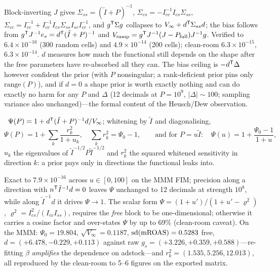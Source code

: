 Block-inverting $J$ gives $\Sigma_{ss} = (\tilde I + P)^{-1}$, $\Sigma_{cs} = -I_{cc}^{-1}I_{cs}\Sigma_{ss}$, $\Sigma_{cc} = I_{cc}^{-1} + I_{cc}^{-1}I_{cs}\Sigma_{ss}I_{sc}I_{cc}^{-1}$, and $g^{\mathsf{T}}\Sigma g$ collapses to $V_\infty + d^{\mathsf{T}}\Sigma_{ss}d$; the bias follows from $g^{\mathsf{T}} J^{-1}e_s = d^{\mathsf{T}}(\tilde I + P)^{-1}$ and $V_{\rm samp} = g^{\mathsf{T}} J^{-1}(J - P_{\rm full})J^{-1}g$. Verified to $6.4\times10^{-16}$ (300 random cells) and $4.9\times10^{-14}$ (200 cells); clean-room $6.3\times10^{-15}$, $6.3\times10^{-14}$. $d$ measures how much the functional still depends on the shape after the free parameters have re-absorbed all they can. The bias ceiling is $-d^{\mathsf{T}}\Delta$ however confident the prior (with $P$ nonsingular; a rank-deficient prior pins only $\mathrm{range}(P)$), and if $d = 0$ a shape prior is worth exactly nothing and can do exactly no harm for any $P$ and $\Delta$ (12 decimals at $P = 10^9$, $|\Delta| \sim 100$; sampling variance also unchanged)---the formal content of the Heusch/Dew observation.

\begin{law}
\label{ident:law:ladder}
\tagEstablished\ $\Psi(P) = 1 + d^{\mathsf{T}}(\tilde I + P)^{-1}d/V_\infty$; whitening by $\tilde I$ and diagonalising,
\begin{equation}
\Psi(P) = 1 + \sum_k\frac{r_k^2}{1 + u_k}, \quad \sum_k r_k^2 = \Psi_0 - 1, \qquad\text{and for } P = u\tilde I:\quad \Psi(u) = 1 + \frac{\Psi_0 - 1}{1 + u},
\label{ident:eq:ladder}
\end{equation}
$u_k$ the eigenvalues of $\tilde I^{-1/2}P\tilde I^{-1/2}$ and $r_k^2$ the squared whitened sensitivity in direction $k$: a prior pays only in directions the functional leaks into.
\end{law}

Exact to $7.9\times10^{-16}$ across $u \in [0, 100]$ on the MMM FIM; precision along a direction with $n^{\mathsf{T}}\tilde I^{-1}d = 0$ leaves $\Psi$ unchanged to 12 decimals at strength $10^8$, while along $\tilde I^{-1}d$ it drives $\Psi \to 1$. The scalar form $\Psi = (1 + u')/(1 + u' - \varrho^2)$, $\varrho^2 = I_{cs}^2/(I_{cc}I_{ss})$, requires the \emph{free} block to be one-dimensional; otherwise it carries a cosine factor and over-states $\Psi$ by up to 69\% (clean-room caveat). On the MMM: $\Psi_0 = 19.804$, $\sqrt{V_\infty} = 0.1187$, $\mathrm{sd}(\mathrm{mROAS}) = 0.5283$ free, $d = (+6.478, -0.229, +0.113)$ against raw $g_s = (+3.226, +0.359, +0.588)$---re-fitting $\beta$ \emph{amplifies} the dependence on adstock---and $r_k^2 = (1.535, 5.256, 12.013)$, all reproduced by the clean-room to 5--6 figures on the exported matrix.

